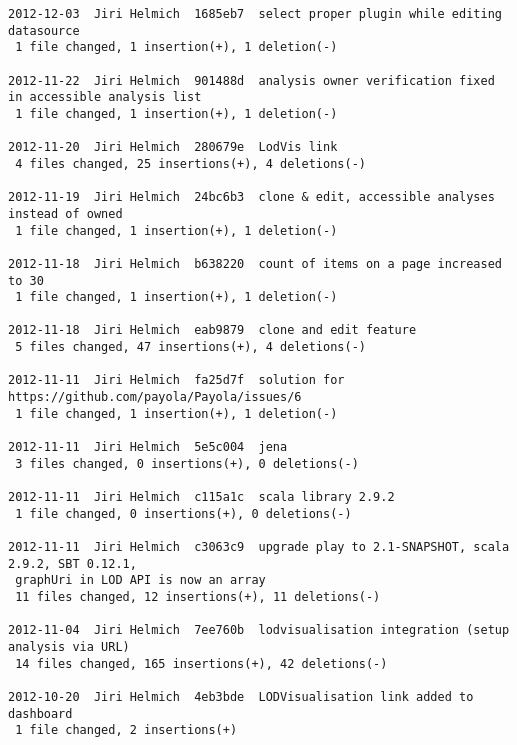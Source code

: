 {\begin{verbatim}
2012-12-03  Jiri Helmich  1685eb7  select proper plugin while editing datasource
 1 file changed, 1 insertion(+), 1 deletion(-)

2012-11-22  Jiri Helmich  901488d  analysis owner verification fixed in accessible analysis list
 1 file changed, 1 insertion(+), 1 deletion(-)

2012-11-20  Jiri Helmich  280679e  LodVis link
 4 files changed, 25 insertions(+), 4 deletions(-)

2012-11-19  Jiri Helmich  24bc6b3  clone & edit, accessible analyses instead of owned
 1 file changed, 1 insertion(+), 1 deletion(-)

2012-11-18  Jiri Helmich  b638220  count of items on a page increased to 30
 1 file changed, 1 insertion(+), 1 deletion(-)

2012-11-18  Jiri Helmich  eab9879  clone and edit feature
 5 files changed, 47 insertions(+), 4 deletions(-)

2012-11-11  Jiri Helmich  fa25d7f  solution for https://github.com/payola/Payola/issues/6
 1 file changed, 1 insertion(+), 1 deletion(-)

2012-11-11  Jiri Helmich  5e5c004  jena
 3 files changed, 0 insertions(+), 0 deletions(-)

2012-11-11  Jiri Helmich  c115a1c  scala library 2.9.2
 1 file changed, 0 insertions(+), 0 deletions(-)

2012-11-11  Jiri Helmich  c3063c9  upgrade play to 2.1-SNAPSHOT, scala 2.9.2, SBT 0.12.1,
 graphUri in LOD API is now an array
 11 files changed, 12 insertions(+), 11 deletions(-)

2012-11-04  Jiri Helmich  7ee760b  lodvisualisation integration (setup analysis via URL)
 14 files changed, 165 insertions(+), 42 deletions(-)

2012-10-20  Jiri Helmich  4eb3bde  LODVisualisation link added to dashboard
 1 file changed, 2 insertions(+)
\end{verbatim}
}